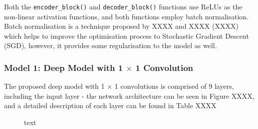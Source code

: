 \documentclass[a4paper]{article}
\begin{document}
Both the \verb|encoder_block()| and \verb|decoder_block()| functions use ReLUs as the non-linear activation functions, and both functions employ batch normalisation. Batch normalisation is a technique proposed by XXXX and XXXX (XXXX) which helps to improve the optimisation process to Stochastic Gradient Descent (SGD), however, it provides some regularisation to the model as well.

\clearpage

\subsubsection{Model 1: Deep Model with 1 $\times$ 1 Convolution}
The proposed deep model with 1 $\times$ 1 convolutions is comprised of 9 layers, including the input layer - the network architecture can be seen in Figure XXXX, and a detailed description of each layer can be found in Table XXXX
\begin{figure}[h]
\centering
{}
\caption{text}
\end{figure}
\end{document}
